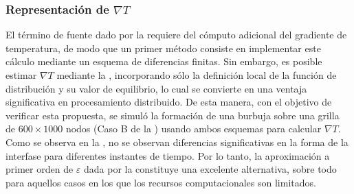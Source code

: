 \subsubsection{Representaci\'on de $\nabla T$}

El t\'ermino de fuente dado por la  requiere del c\'omputo adicional del gradiente de temperatura, de modo que un primer m\'etodo consiste en implementar este c\'alculo mediante un esquema de diferencias finitas. Sin embargo, es posible estimar $\nabla T$ mediante la , incorporando s\'olo la definici\'on local de la funci\'on de distribuci\'on y su valor de equilibrio, lo cual se convierte en una ventaja significativa en procesamiento distribuido. De esta manera, con el objetivo de verificar esta propuesta, se simul\'o la formaci\'on de una burbuja sobre una grilla de $600\times 1000$ nodos (Caso B de la ) usando ambos esquemas para calcular $\nabla T$. Como se observa en la , no se observan diferencias significativas en la forma de la interfase para diferentes instantes de tiempo. Por lo tanto, la aproximaci\'on a primer orden de $\varepsilon$ dada por la  constituye una excelente alternativa, sobre todo para aquellos casos en los que los recursos computacionales son limitados.

